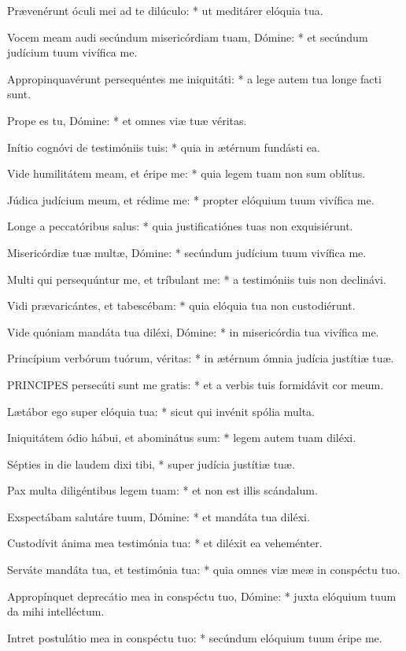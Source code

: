 Prævenérunt óculi mei ad te dilúculo: * ut meditárer elóquia tua.

Vocem meam audi secúndum misericórdiam tuam, Dómine: * et secúndum judícium tuum vivífica me.

Appropinquavérunt persequéntes me iniquitáti: * a lege autem tua longe facti sunt.

Prope es tu, Dómine: * et omnes viæ tuæ véritas.

Inítio cognóvi de testimóniis tuis: * quia in ætérnum fundásti ea.

Vide humilitátem meam, et éripe me: * quia legem tuam non sum oblítus.

Júdica judícium meum, et rédime me: * propter elóquium tuum vivífica me.

Longe a peccatóribus salus: * quia justificatiónes tuas non exquisiérunt.

Misericórdiæ tuæ multæ, Dómine: * secúndum judícium tuum vivífica me.

Multi qui persequúntur me, et tríbulant me: * a testimóniis tuis non declinávi.

Vidi prævaricántes, et tabescébam: * quia elóquia tua non custodiérunt.

Vide quóniam mandáta tua diléxi, Dómine: * in misericórdia tua vivífica me.

Princípium verbórum tuórum, véritas: * in ætérnum ómnia judícia justítiæ tuæ.


\lettrine[lines=2]{P}{RINCIPES} persecúti sunt me gratis: * et a verbis tuis formidávit cor meum.

Lætábor ego super elóquia tua: * sicut qui invénit spólia multa.

Iniquitátem ódio hábui, et abominátus sum: * legem autem tuam diléxi.

Sépties in die laudem dixi tibi, * super judícia justítiæ tuæ.

Pax multa diligéntibus legem tuam: * et non est illis scándalum.

Exspectábam salutáre tuum, Dómine: * et mandáta tua diléxi.

Custodívit ánima mea testimónia tua: * et diléxit ea veheménter.

Serváte mandáta tua, et testimónia tua: * quia omnes viæ meæ in conspéctu tuo.

Appropínquet deprecátio mea in conspéctu tuo, Dómine: * juxta elóquium tuum da mihi intelléctum.

Intret postulátio mea in conspéctu tuo: * secúndum elóquium tuum éripe me.

